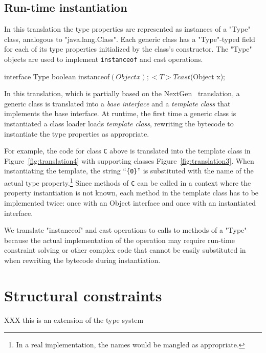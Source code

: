 \documentclass[preprint,nocopyrightspace,9pt]{sigplanconf}
\begin{document}
\subsection{Run-time instantiation}

In this translation the type properties are represented as
instances of a \xcd"Type" class, analogous to \xcd"java.lang.Class".
Each generic class has a \xcd"Type"-typed field for each of
its type properties initialized by the class's constructor.
The \xcd"Type" objects
are used to implement {\tt instanceof} and cast operations.
\begin{xten}
interface Type {
    boolean instanceof$(Object x);
    <T> T cast$(Object x);
}
\end{xten}


In this translation, which is partially based on the
NextGen~\cite{allen03,allen04} translation,
a generic class is translated into a \emph{base interface} and
a \emph{template class} that implements the base interface.
At runtime, the first time a generic class is instantiated
a class loader loads \emph{template class}, rewriting the
bytecode to instantiate the type properties as appropriate.

For example, the
code for class {\tt C} above is translated into the template
class in Figure~\ref{fig:translation4}
with supporting classes Figure~\ref{fig:translation3}.
When instantiating the template, the string ``{\tt \{0\}}'' is
substituted with the name of the actual type
property.\footnote{In a real implementation, the names would be
mangled as appropriate.}
Since methods of {\tt C} can be called in a context where the
property instantiation is not known,
each method in the template class has to be implemented twice:
once with an Object interface and once with an instantiated
interface.

We translate \xcd"instanceof" and cast operations to calls to
methods of a \xcd"Type" because the actual implementation of
the operation may require run-time constraint solving or other
complex code that cannot be easily substituted in when rewriting
the bytecode during instantiation.

\section{Structural constraints}
\label{sec:structural}

XXX this is an extension of the type system
\end{document}
